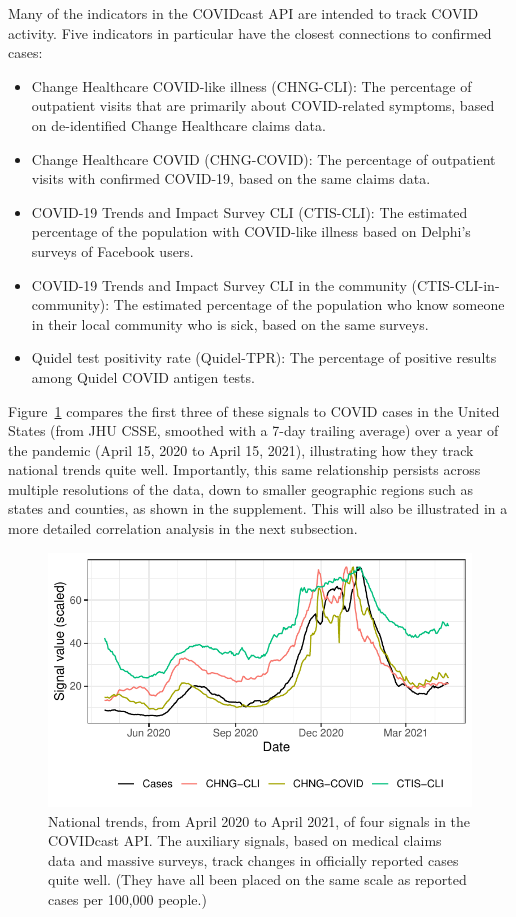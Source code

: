 \documentclass[9pt,twocolumn,twoside,lineno]{pnas-new}
\begin{document}
Many of the indicators in the COVIDcast API are intended to track COVID
activity. Five indicators in particular have the closest connections to
confirmed cases:

\begin{itemize}
\item Change Healthcare COVID-like illness (CHNG-CLI): The percentage of
  outpatient visits that are primarily about COVID-related symptoms, based on
  de-identified Change Healthcare claims data.
\item Change Healthcare COVID (CHNG-COVID): The percentage of outpatient visits
  with confirmed COVID-19, based on the same claims data.
\item COVID-19 Trends and Impact Survey CLI (CTIS-CLI): The estimated percentage
  of the population with COVID-like illness based on Delphi's surveys of
  Facebook users.
\item COVID-19 Trends and Impact Survey CLI in the community
  (CTIS-CLI-in-community): The estimated percentage of the population who know
  someone in their local community who is sick, based on the same surveys.
\item Quidel test positivity rate (Quidel-TPR): The percentage of positive
  results among Quidel COVID antigen tests.
\end{itemize}

Figure~\ref{fig:time_trends_national} compares the first three of these signals
to COVID cases in the United States (from JHU CSSE, smoothed with a 7-day
trailing average) over a year of the pandemic (April 15, 2020 to April 15,
2021), illustrating how they track national trends quite well.  Importantly,
this same relationship persists across multiple resolutions of the data, down to
smaller geographic regions such as states and counties, as shown in the
supplement.  This will also be illustrated in a more detailed correlation
analysis in the next subsection.

\begin{figure}[t]
  \includegraphics[width=\columnwidth]{fig/time_trends_national.pdf}
  \caption{National trends, from April 2020 to April 2021, of four signals in
    the COVIDcast API. The auxiliary signals, based on medical claims data and
    massive surveys, track changes in officially reported cases quite
    well. (They have all been placed on the same scale as reported cases per
    100,000 people.)}
  \label{fig:time_trends_national}
\end{figure}
\end{document}
